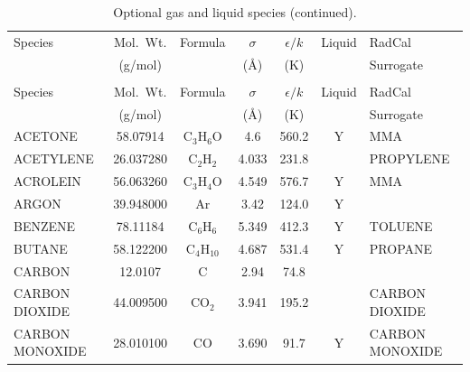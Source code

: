 \documentclass[11pt]{book}
\begin{document}
\clearpage
\begin{longtable}{@{\extracolsep{\fill}}|l|c|c|c|c|c|l|}
\caption[Optional gas and liquid species]{Optional gas and liquid species~\cite{Reid:1}}
\label{tab:gasspecies}\\
\hline
Species &   Mol.~Wt.            & Formula          & $\sigma$ & $\epsilon/k$   & Liquid   & RadCal                     \\
        &   (g/mol)             &                  & (\AA)    & (K)            &          & Surrogate                  \\
\hline \hline
\endfirsthead
\caption[]{Optional gas and liquid species (continued).}\\
\hline
Species &   Mol.~Wt.            & Formula          & $\sigma$ & $\epsilon/k$   & Liquid   & RadCal                     \\
        &   (g/mol)             &                  & (\AA)    & (K)            &          & Surrogate                  \\
\hline \hline
\endhead
{\ct ACETONE}            & 58.07914   & C$_3$H$_6$O      & 4.6      & 560.2    &  Y       &  {\ct MMA}                 \\ \hline
{\ct ACETYLENE}          & 26.037280  & C$_2$H$_2$       & 4.033    & 231.8    &          &  {\ct PROPYLENE}           \\ \hline
{\ct ACROLEIN}           & 56.063260  & C$_3$H$_4$O      & 4.549    & 576.7    &  Y       &  {\ct MMA}                 \\ \hline
{\ct ARGON}              & 39.948000  & Ar               & 3.42     & 124.0    &  Y       &                            \\ \hline
{\ct BENZENE}            & 78.11184   & C$_6$H$_6$       & 5.349    & 412.3    &  Y       &  {\ct TOLUENE}             \\ \hline
{\ct BUTANE}             & 58.122200  & C$_4$H$_{10}$    & 4.687    & 531.4    &  Y       &  {\ct PROPANE}             \\ \hline
{\ct CARBON}             & 12.0107    & C                & 2.94     & 74.8     &          &                            \\ \hline
{\ct CARBON DIOXIDE}     & 44.009500  & CO$_2$           & 3.941    & 195.2    &          &  {\ct CARBON DIOXIDE}      \\ \hline
{\ct CARBON MONOXIDE}    & 28.010100  & CO               & 3.690    & 91.7     &  Y       &  {\ct CARBON MONOXIDE}     \\ \hline

\end{longtable}
\end{document}
